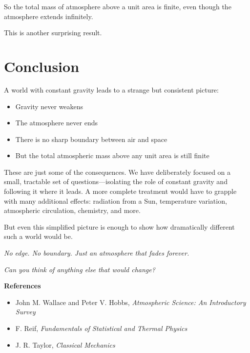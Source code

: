\documentclass[11pt, letterpaper]{article}
\begin{document}
So the total mass of atmosphere above a unit area is finite, even though the atmosphere extends infinitely.

This is another surprising result.


\section*{Conclusion}

A world with constant gravity leads to a strange but consistent picture:

\begin{itemize}
\item Gravity never weakens
\item The atmosphere never ends
\item There is no sharp boundary between air and space
\item But the total atmospheric mass above any unit area is still finite
\end{itemize}

These are just some of the consequences. We have deliberately focused on a small, tractable set of questions---isolating the role of constant gravity and following it where it leads. A more complete treatment would have to grapple with many additional effects: radiation from a Sun, temperature variation, atmospheric circulation, chemistry, and more.

But even this simplified picture is enough to show how dramatically different such a world would be.

\bigskip

\begin{center}
\textit{No edge. No boundary. Just an atmosphere that fades forever.}
\end{center}

\bigskip

\begin{center}
\textit{Can you think of anything else that would change?}
\end{center}

\vspace{1cm}

\textbf{References}

\begin{itemize}
\item John M. Wallace and Peter V. Hobbs, \textit{Atmospheric Science: An Introductory Survey}
\item F. Reif, \textit{Fundamentals of Statistical and Thermal Physics}
\item J. R. Taylor, \textit{Classical Mechanics}
\end{itemize}
\end{document}
